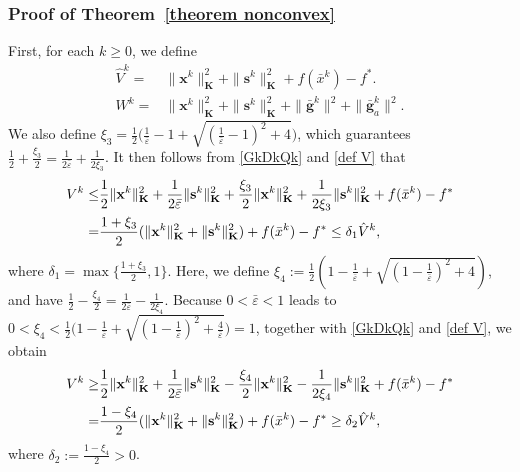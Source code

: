 \documentclass[12pt,draftcls,onecolumn]{IEEEtran}
\begin{document}
\subsubsection{Proof of Theorem~\ref{theorem nonconvex}}\label{proof theorem nonconvex}
First, for each $k\geq 0$, we define
\begin{align}
	\hat{V}^k =& \|\mathbf{x}^k\|_\mathbf{K}^2 + \|\mathbf{s}^k\|^2_\mathbf{K} + f(\bar{x}^k) - f^*. \label{hatVk}\\
	\label{Wk}W^k =& \|\mathbf{x}^{k}\|^2_{\mathbf{K}} +  \|\mathbf{s}^k\|^2_\mathbf{K} + \|\bar{\mathbf{g}}^k\|^2 + \|\bar{\mathbf{g}}^k_a\|^2.
\end{align}
We also define $\xi_3=\frac{1}{2}\big(\frac{1}{\bar{\varepsilon}}-1+\sqrt{(\frac{1}{\bar{\varepsilon}}-1)^2+4}\big)$, which guarantees ${\frac{1}{2}}+\frac{\xi_3}{2}={\frac{1}{2\bar{\varepsilon}}}+\frac{1}{2{\xi_3}}$. It then follows from \eqref{GkDkQk} and \eqref{def V} that
\begin{align}
	V^k \leq & {\frac{1}{2}} \|\mathbf{x}^k\|^2_\mathbf{K} + {\frac{1}{2\bar{\varepsilon}}} \|\mathbf{s}^k\|^2_\mathbf{K} + \frac{{\xi_3}}{2}\|\mathbf{x}^k\|^2_\mathbf{K}+ \frac{1}{2{\xi_3}}\|\mathbf{s}^k\|^2_\mathbf{K} + f(\bar{x}^k) - f^* \notag\\
	= & {\frac{1+{\xi_3}}{2}}(\|\mathbf{x}^k\|^2_\mathbf{K} + \|\mathbf{s}^k\|^2_\mathbf{K}) +f(\bar{x}^k) - f^*\leq  {\delta_1} \hat{V}^k, \label{delta2}
\end{align}
where ${\delta_1} = \max\{\frac{1+\xi_3}{2},1\}$. Here, we define $\xi_4:=\frac{1}{2}(1-\frac{1}{\bar{\varepsilon}}+\sqrt{(1-\frac{1}{\bar{\varepsilon}})^2+4})$, and have ${\frac{1}{2}}-\frac{\xi_4}{2}={\frac{1}{2\bar{\varepsilon}}}-\frac{1}{2{\xi_4}}$. Because $0<\bar{\varepsilon}<1$ leads to $0<\xi_4<\frac{1}{2}\big(1-\frac{1}{\bar{\varepsilon}}+\sqrt{(1-\frac{1}{\bar{\varepsilon}})^2+\frac{4}{\bar{\varepsilon}}}\big)=1$, together with \eqref{GkDkQk} and \eqref{def V}, we obtain
\begin{align}
	V^k \geq & {\frac{1}{2}} \|\mathbf{x}^k\|^2_\mathbf{K} + {\frac{1}{2\bar{\varepsilon}}} \|\mathbf{s}^k\|^2_\mathbf{K} - \frac{{\xi_4}}{2}\|\mathbf{x}^k\|^2_\mathbf{K} - \frac{1}{2{\xi_4}}\|\mathbf{s}^k\|^2_\mathbf{K} + f(\bar{x}^k) - f^* \notag\\
	= & {\frac{1-{\xi_4}}{2}}(\|\mathbf{x}^k\|^2_\mathbf{K} + \|\mathbf{s}^k\|^2_\mathbf{K})+f(\bar{x}^k) - f^*\geq  {\delta_2} \hat{V}^k, \label{deltassumption: optimality}
\end{align}
where $\delta_2:=\frac{1-{\xi_4}}{2}>0$.
\end{document}
